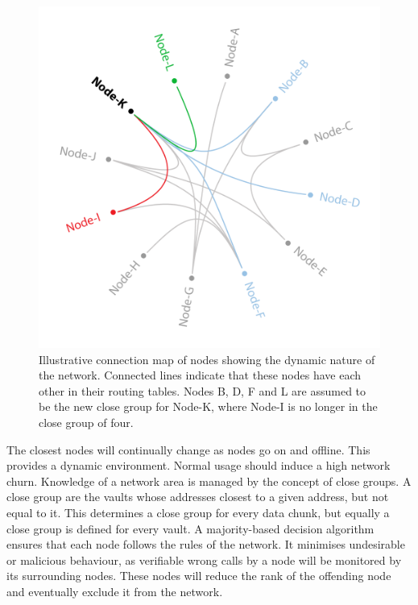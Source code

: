 \documentclass[twocolumn,english]{article}
\begin{document}
\begin{figure}[hbtp]
\centering
\includegraphics[scale=0.2]{connection-map.png}
\caption{Illustrative connection map of nodes showing the dynamic nature of the network. Connected lines indicate that these nodes have each other in their routing tables.  Nodes B, D, F and L are assumed to be the new close group for Node-K, where Node-I is no longer in the close group of four.}
\end{figure}
The closest nodes will continually change as nodes go on and offline. This provides a dynamic environment.  Normal usage should  induce a high network churn. Knowledge of a network area is managed by the concept of close groups.  A close group are the vaults whose addresses closest to a given address, but not equal to it.  This determines a close group for every data chunk, but equally a close group is defined for every vault. A majority-based decision algorithm ensures that each node follows the rules of the network. It minimises undesirable or malicious behaviour, as verifiable wrong calls by a node will be monitored by its surrounding nodes.  These nodes will reduce the rank of the offending node and eventually exclude it from the network.\cite{msVault} 
\end{document}
